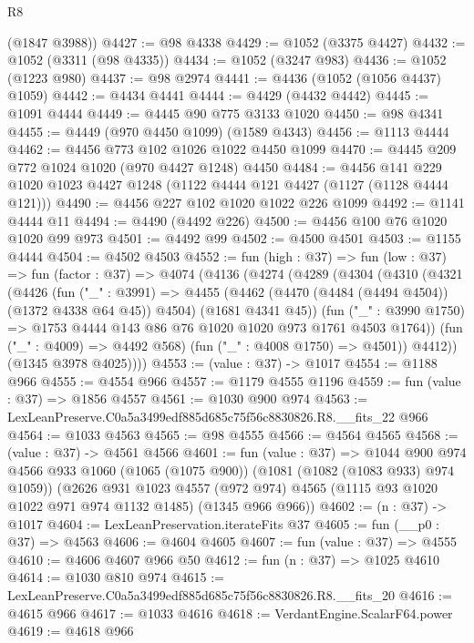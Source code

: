 \begin{lexlean}{R8}
\begin{coremodule}
      (@1847 @3988))
@4427 := @98 @4338
@4429 := @1052 (@3375 @4427)
@4432 := @1052 (@3311 (@98 @4335))
@4434 := @1052 (@3247 @983)
@4436 := @1052 (@1223 @980)
@4437 := @98 @2974
@4441 := @4436 (@1052 (@1056 @4437) @1059)
@4442 := @4434 @4441
@4444 := @4429 (@4432 @4442)
@4445 := @1091 @4444
@4449 := @4445 @90 @775 @3133 @1020
@4450 := @98 @4341
@4455 := @4449 (@970 @4450 @1099) (@1589 @4343)
@4456 := @1113 @4444
@4462 := @4456 @773 @102 @1026 @1022 @4450 @1099
@4470 := @4445 @209 @772 @1024 @1020 (@970 @4427 @1248) @4450
@4484 := @4456 @141 @229 @1020 @1023 @4427 @1248 (@1122 @4444 @121 @4427 (@1127 (@1128 @4444 @121)))
@4490 := @4456 @227 @102 @1020 @1022 @226 @1099
@4492 := @1141 @4444 @11
@4494 := @4490 (@4492 @226)
@4500 := @4456 @100 @76 @1020 @1020 @99 @973
@4501 := @4492 @99
@4502 := @4500 @4501
@4503 := @1155 @4444
@4504 := @4502 @4503
@4552 := fun (high : @37) =>
  fun (low : @37) =>
  fun (factor : @37) =>
  @4074
    (@4136
      (@4274
        (@4289
          (@4304
            (@4310
              (@4321
                (@4426
                  (fun ("_" : @3991) =>
                  @4455
                    (@4462 (@4470 (@4484 (@4494 @4504)) (@1372 @4338 @64 @45)) @4504)
                    (@1681 @4341 @45))
                  (fun ("_" : @3990 @1750) =>
                  @1753 @4444 @143 @86 @76 @1020 @1020 @973 @1761 @4503 @1764))
                (fun ("_" : @4009) => @4492 @568)
                (fun ("_" : @4008 @1750) => @4501))
              @4412))
          (@1345 @3978 @4025))))
@4553 := (value : @37) -> @1017
@4554 := @1188 @966
@4555 := @4554 @966
@4557 := @1179 @4555 @1196
@4559 := fun (value : @37) => @1856 @4557
@4561 := @1030 @900 @974
@4563 := LexLeanPreserve.C0a5a3499edf885d685c75f56c8830826.R8.__fits_22 @966
@4564 := @1033 @4563
@4565 := @98 @4555
@4566 := @4564 @4565
@4568 := (value : @37) -> @4561 @4566
@4601 := fun (value : @37) =>
  @1044
    @900
    @974
    @4566
    @933
    @1060
    (@1065 (@1075 @900))
    (@1081 (@1082 (@1083 @933) @974 @1059))
    (@2626
      @931
      @1023
      @4557
      (@972 @974)
      @4565
      (@1115 @93 @1020 @1022 @971 @974 @1132 @1485)
      (@1345 @966 @966))
@4602 := (n : @37) -> @1017
@4604 := LexLeanPreservation.iterateFits @37
@4605 := fun (__p0 : @37) => @4563
@4606 := @4604 @4605
@4607 := fun (value : @37) => @4555
@4610 := @4606 @4607 @966 @50
@4612 := fun (n : @37) => @1025 @4610
@4614 := @1030 @810 @974
@4615 := LexLeanPreserve.C0a5a3499edf885d685c75f56c8830826.R8.__fits_20
@4616 := @4615 @966
@4617 := @1033 @4616
@4618 := VerdantEngine.ScalarF64.power
@4619 := @4618 @966

\end{coremodule}
\end{lexlean}
